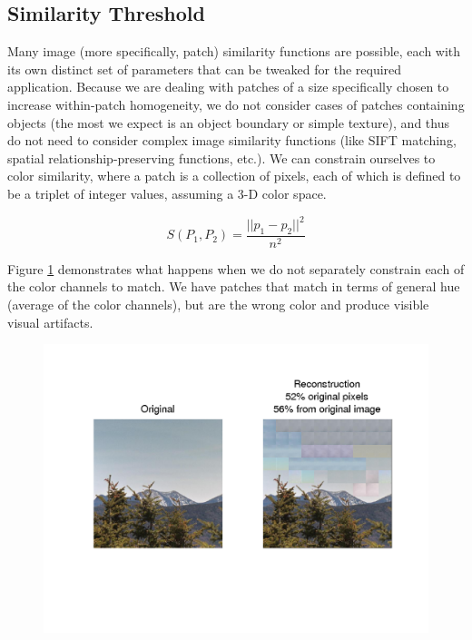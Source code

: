 \subsection{Similarity Threshold}

Many image (more specifically, patch) similarity functions are possible, each with its own distinct set of parameters that can be tweaked for the required application. Because we are dealing with patches of a size specifically chosen to increase within-patch homogeneity, we do not consider cases of patches containing objects (the most we expect is an object boundary or simple texture), and thus do not need to consider complex image similarity functions (like SIFT matching, spatial relationship-preserving functions, etc.). We can constrain ourselves to color similarity, where a patch is a collection of pixels, each of which is defined to be a triplet of integer values, assuming a 3-D color space.

\begin{displaymath}
S(P_1, P_2) = \frac{||p_1 - p_2||^2}{n^2}
\end{displaymath}

Figure \ref{fig:colProblem} demonstrates what happens when we do not separately constrain each of the color channels to match. We have patches that match in terms of general hue (average of the color channels), but are the wrong color and produce visible visual artifacts.

 \begin{figure}
\includegraphics[width=1\linewidth]{Figures/197.png}
\caption{}
\label{fig:colProblem}
\end{figure}

